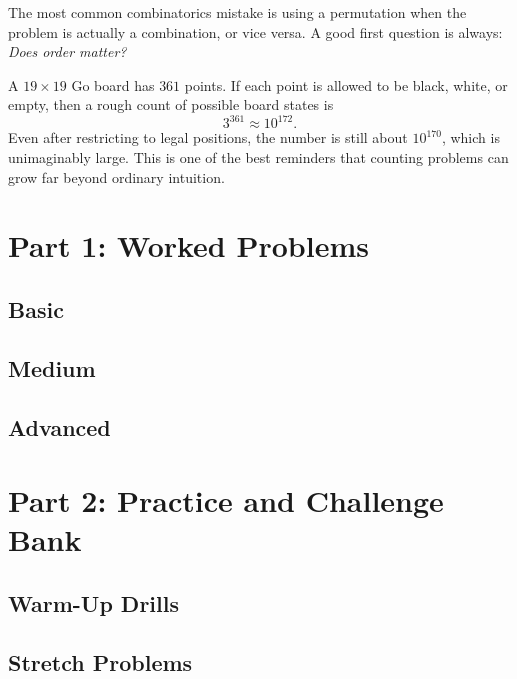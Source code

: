 \documentclass[12pt]{article}
\newenvironment{remark}[1][]{%
  \begin{remarkbox}[title={\bfseries Remark~\thetcbcounter\ifx\relax#1\relax\else\ (#1)\fi}]%
}{%
  \end{remarkbox}%
}
\begin{document}
\begin{remark}
The most common combinatorics mistake is using a permutation when the problem is actually a combination, or vice versa. A good first question is always: \emph{Does order matter?}
\end{remark}

\begin{remark}[How fast counting grows]
A $19\times 19$ Go board has $361$ points. If each point is allowed to be black, white, or empty, then a rough count of possible board states is
\[
3^{361}\approx 10^{172}.
\]
Even after restricting to legal positions, the number is still about $10^{170}$, which is unimaginably large. This is one of the best reminders that counting problems can grow far beyond ordinary intuition.
\end{remark}

\section{Part 1: Worked Problems}

\subsection{Basic}


\subsection{Medium}


\subsection{Advanced}


\section{Part 2: Practice and Challenge Bank}

\subsection{Warm-Up Drills}


\subsection{Stretch Problems}

\end{document}
